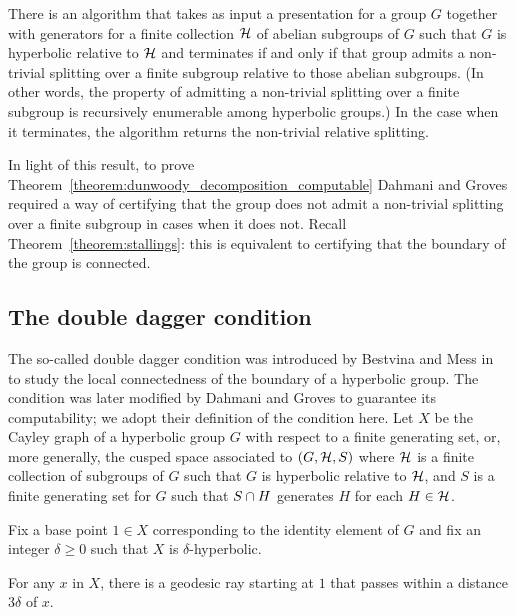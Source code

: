 \begin{proposition}\cite[Proposition 5.2]{dahmanigroves08a}
  There is an algorithm that takes as input a presentation for a group $G$ together with generators for a finite collection $\mathcal{H}$ of abelian subgroups of $G$ such that $G$ is hyperbolic relative to $\mathcal{H}$ and terminates if and only if that group admits a non-trivial splitting over a finite subgroup relative to those abelian subgroups.
  (In other words, the property of admitting a non-trivial splitting over a finite subgroup is recursively enumerable among hyperbolic groups.)
  In the case when it terminates, the algorithm returns the non-trivial relative splitting.
\end{proposition}

In light of this result, to prove Theorem~\ref{theorem:dunwoody_decomposition_computable} Dahmani and Groves required a way of certifying that the group does not admit a non-trivial splitting over a finite subgroup in cases when it does not.
Recall Theorem~\ref{theorem:stallings}: this is equivalent to certifying that the boundary of the group is connected. 

\subsection{The double dagger condition}\label{section:double_dagger}

The so-called double dagger condition was introduced by Bestvina and Mess in~\cite{bestvinamess91} to study the local connectedness of the boundary of a hyperbolic group.
The condition was later modified by Dahmani and Groves to guarantee its computability; we adopt their definition of the condition here.
Let $X$ be the Cayley graph of a hyperbolic group $G$ with respect to a finite generating set, or, more generally, the cusped space associated to $(G, \mathcal{H}, S)$ where $\mathcal{H}$ is a finite collection of subgroups of $G$ such that $G$ is hyperbolic relative to $\mathcal{H}$, and $S$ is a finite generating set for $G$ such that $S \cap H$ generates $H$ for each $H \in \mathcal{H}$.

Fix a base point $1 \in X$ corresponding to the identity element of $G$ and fix an integer $\delta \geq 0$ such that $X$ is $\delta$-hyperbolic.

\begin{lemma}\cite[Lemma 2.11]{dahmanigroves08a}\label{lemma:close_geodesic_ray}
  For any $x$ in $X$, there is a geodesic ray starting at $1$ that passes within a distance $3\delta$ of $x$.
\end{lemma}

